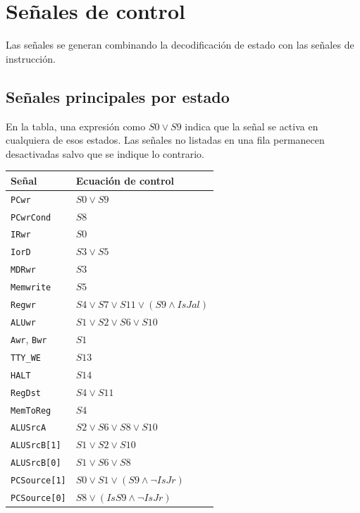 \documentclass[11pt,a4paper]{article}
\begin{document}
\section{Señales de control}

Las señales se generan combinando la decodificación de estado con las señales de instrucción.

\subsection{Señales principales por estado}

En la tabla, una expresión como $S0\lor S9$ indica que la señal se activa en cualquiera de esos estados. Las señales no listadas en una fila permanecen desactivadas salvo que se indique lo contrario.

\begin{longtable}{@{}lp{10cm}@{}}
    \toprule
    \textbf{Señal} & \textbf{Ecuación de control} \\
    \midrule
    \texttt{PCwr} & $S0 \lor S9$ \\
    \texttt{PCwrCond} & $S8$ \\
    \texttt{IRwr} & $S0$ \\
    \texttt{IorD} & $S3 \lor S5$ \\
    \texttt{MDRwr} & $S3$ \\
    \texttt{Memwrite} & $S5$ \\
    \texttt{Regwr} & $S4 \lor S7 \lor S11 \lor (S9\land IsJal)$ \\
    \texttt{ALUwr} & $S1 \lor S2 \lor S6 \lor S10$ \\
    \texttt{Awr}, \texttt{Bwr} & $S1$ \\
    \texttt{TTY\_WE} & $S13$ \\
    \texttt{HALT} & $S14$ \\
    \texttt{RegDst} & $S4 \lor S11$ \\
    \texttt{MemToReg} & $S4$ \\
    \texttt{ALUSrcA} & $S2 \lor S6 \lor S8 \lor S10$ \\
    \texttt{ALUSrcB[1]} & $S1 \lor S2 \lor S10$ \\
    \texttt{ALUSrcB[0]} & $S1 \lor S6 \lor S8$ \\
    \texttt{PCSource[1]} & $S0 \lor S1 \lor (S9\land\neg IsJr)$ \\
    \texttt{PCSource[0]} & $S8 \lor (IsS9\land\neg IsJr)$ \\
    \bottomrule
\end{longtable}
\end{document}
